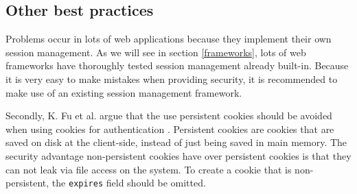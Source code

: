 \subsection{Other best practices}

Problems occur in lots of web applications because they implement their own session management. As we will see in section \ref{frameworks}, lots of web frameworks have thoroughly tested session management already built-in. Because it is very easy to make mistakes when providing security, it is recommended to make use of an existing session management framework.

Secondly, K. Fu et al. argue that the use persistent cookies should be avoided when using cookies for authentication \cite{Fu2001}. Persistent cookies are cookies that are saved on disk at the client-side, instead of just being saved in main memory. The security advantage non-persistent cookies have over persistent cookies is that they can not leak via file access on the system. To create a cookie that is non-persistent, the \texttt{expires} field should be omitted.
